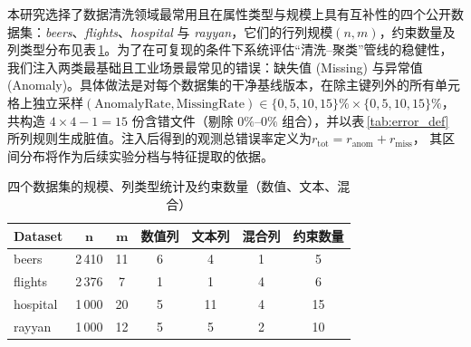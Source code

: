 \documentclass[10pt]{article} %
\numberwithin{equation}{section}
\begin{document}
\textcolor[rgb]{0.00,0.07,1.00}{本研究选择了数据清洗领域最常用且在属性类型与规模上具有互补性的四个公开数据集：\emph{beers}、\emph{flights}、\emph{hospital} 与 \emph{rayyan}，它们的行列规模\((n,m)\)，约束数量及列类型分布见表 \ref{tab:dataset_overview}。为了在可复现的条件下系统评估“清洗–聚类”管线的稳健性，我们注入两类最基础且工业场景最常见的错误：缺失值 (Missing) 与异常值 (Anomaly)。具体做法是对每个数据集的干净基线版本，在除主键列外的所有单元格上独立采样\((\text{AnomalyRate},
\text{MissingRate})\in\{0,5,10,15\}\%\times\{0,5,10,15\}\%\)，
共构造 \(4\times4-1=15\) 份含错文件（剔除 \(0\%–0\%\) 组合），并以表 \ref{tab:error_def} 所列规则生成脏值。注入后得到的观测总错误率定义为\(r_{\text{tot}}=r_{\text{anom}}+r_{\text{miss}}\)，
其区间分布将作为后续实验分档与特征提取的依据。}
\begin{table}[htbp]
  \centering\small
  \setlength{\tabcolsep}{6pt}
  \renewcommand{\arraystretch}{1.2}
  \caption{四个数据集的规模、列类型统计及约束数量（数值、文本、混合）}
  \begin{tabular}{lcccccc}
    \toprule
    \textbf{Dataset} & $\boldsymbol{n}$ & $\boldsymbol{m}$ & \textbf{数值列} & \textbf{文本列} & \textbf{混合列} & \textbf{约束数量}\\
    \midrule
    beers    & 2\,410 & 11 & 6 & 4 & 1 & 5 \\
    flights  & 2\,376 & 7  & 1 & 1 & 4 & 6 \\
    hospital & 1\,000 & 20 & 5 & 11 & 4 & 15 \\
    rayyan   & 1\,000 & 12 & 5 & 5 & 2 & 10 \\
    \bottomrule
  \end{tabular}
  \label{tab:dataset_overview}
\end{table}
\end{document}
